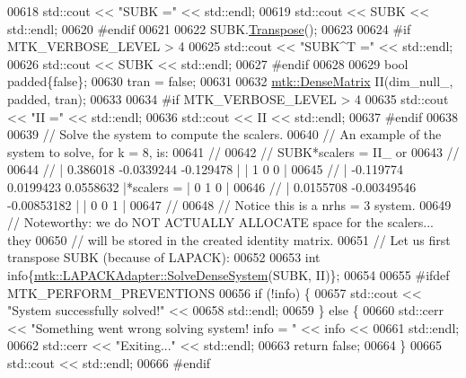 \begin{DoxyCode}
{{00618   std::cout << \textcolor{stringliteral}{"SUBK ="} << std::endl;
00619   std::cout << SUBK << std::endl;
00620 \textcolor{preprocessor}{  #endif}
00621 
00622   SUBK.\hyperlink{classmtk_1_1DenseMatrix_a71d9c07ca66e88d97d1fd5012f43138b}{Transpose}();
00623 
00624 \textcolor{preprocessor}{  #if MTK\_VERBOSE\_LEVEL > 4}
00625   std::cout << \textcolor{stringliteral}{"SUBK^T ="} << std::endl;
00626   std::cout << SUBK << std::endl;
00627 \textcolor{preprocessor}{  #endif}
00628 
00629   \textcolor{keywordtype}{bool} padded\{\textcolor{keyword}{false}\};
00630   tran = \textcolor{keyword}{false};
00631 
00632   \hyperlink{classmtk_1_1DenseMatrix}{mtk::DenseMatrix} II(dim\_null\_, padded, tran);
00633 
00634 \textcolor{preprocessor}{  #if MTK\_VERBOSE\_LEVEL > 4}
00635   std::cout << \textcolor{stringliteral}{"II ="} << std::endl;
00636   std::cout << II << std::endl;
00637 \textcolor{preprocessor}{  #endif}
00638 
00639   \textcolor{comment}{// Solve the system to compute the scalers.}
00640   \textcolor{comment}{// An example of the system to solve, for k = 8, is:}
00641   \textcolor{comment}{//}
00642   \textcolor{comment}{// SUBK*scalers = II\_ or}
00643   \textcolor{comment}{//}
00644   \textcolor{comment}{// |  0.386018  -0.0339244   -0.129478 |           | 1 0 0 |}
00645   \textcolor{comment}{// | -0.119774   0.0199423   0.0558632 |*scalers = | 0 1 0 |}
00646   \textcolor{comment}{// | 0.0155708 -0.00349546 -0.00853182 |           | 0 0 1 |}
00647   \textcolor{comment}{//}
00648   \textcolor{comment}{// Notice this is a nrhs = 3 system.}
00649   \textcolor{comment}{// Noteworthy: we do NOT ACTUALLY ALLOCATE space for the scalers... they}
00650   \textcolor{comment}{// will be stored in the created identity matrix.}
00651   \textcolor{comment}{// Let us first transpose SUBK (because of LAPACK):}
00652 
00653   \textcolor{keywordtype}{int} info\{\hyperlink{classmtk_1_1LAPACKAdapter_a7428bccf74fd4a4af68fb7233846da22}{mtk::LAPACKAdapter::SolveDenseSystem}(SUBK, II)\};
00654 
00655 \textcolor{preprocessor}{  #ifdef MTK\_PERFORM\_PREVENTIONS}
00656   \textcolor{keywordflow}{if} (!info) \{
00657     std::cout << \textcolor{stringliteral}{"System successfully solved!"} <<
00658       std::endl;
00659   \} \textcolor{keywordflow}{else} \{
00660     std::cerr << \textcolor{stringliteral}{"Something went wrong solving system! info = "} << info <<
00661       std::endl;
00662     std::cerr << \textcolor{stringliteral}{"Exiting..."} << std::endl;
00663     \textcolor{keywordflow}{return} \textcolor{keyword}{false};
00664   \}
00665   std::cout << std::endl;
00666 \textcolor{preprocessor}{  #endif}
}}
\end{DoxyCode}
